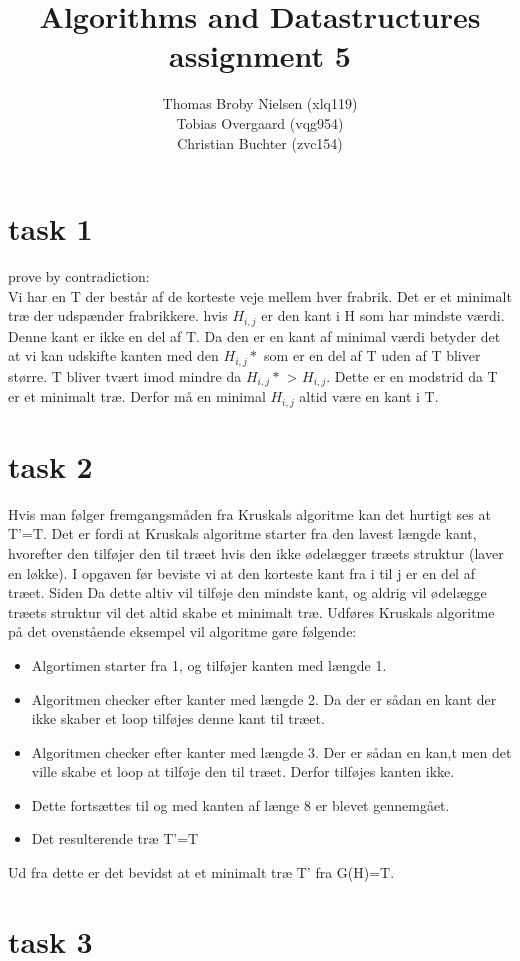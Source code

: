 \documentclass[12pt]{article}
\title{Algorithms and Datastructures assignment 5}
\author{Thomas Broby Nielsen (xlq119)\\ Tobias Overgaard (vqg954)\\ Christian Buchter (zvc154)}
\begin{document}
\maketitle
\section*{task 1}
prove by contradiction:\\
Vi har en T der består af de korteste veje mellem hver frabrik. Det er et minimalt træ der udspænder frabrikkere. hvis $H_{i,j}$ er den kant i H som har mindste værdi. Denne kant er ikke en del af T. Da den er en kant af minimal værdi betyder det at vi kan udskifte kanten med den $H_{i,j}*$ som er en del af T uden af T bliver større. T bliver tvært imod mindre da  $H_{i,j}*$ > $H_{i,j}$. Dette er en modstrid da T er et minimalt træ. Derfor må en minimal $H_{i,j}$ altid være en kant i T.

\newpage
\section*{task 2}
Hvis man følger fremgangsmåden fra Kruskals algoritme kan det hurtigt ses at T'=T. Det er fordi at Kruskals algoritme starter fra den lavest længde kant, hvorefter den tilføjer den til træet hvis den ikke ødelægger træets struktur (laver en løkke). I opgaven før beviste vi at den korteste kant fra i til j er en del af træet. Siden Da dette altiv vil tilføje den mindste kant, og aldrig vil ødelægge træets struktur vil det altid skabe et minimalt træ. Udføres Kruskals  algoritme på det ovenstående eksempel vil algoritme gøre følgende:
\begin{itemize}
\item Algortimen starter fra 1, og tilføjer kanten med længde 1.
\item Algoritmen checker efter kanter med længde 2. Da der er sådan en kant der ikke skaber et loop tilføjes denne kant til træet.
\item Algoritmen checker efter kanter med længde 3. Der er sådan en kan,t men det ville skabe et loop at tilføje den til træet. Derfor tilføjes kanten ikke.
\item Dette fortsættes til og med kanten af længe 8 er blevet gennemgået.
\item Det resulterende træ T'=T
\end{itemize}
Ud fra dette er det bevidst at et minimalt træ T' fra G(H)=T.
\newpage
\section*{task 3}
\end{document}
